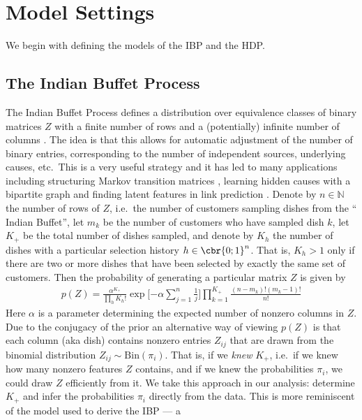 \documentclass[twoside,11pt]{article}
\begin{document}
\section{Model Settings}
\label{sec:model}
We begin with defining the models of the IBP and the HDP.
\subsection{The Indian Buffet Process}
\label{sec:ibp}

The Indian Buffet Process defines a distribution over equivalence
classes of binary matrices $Z$ with a finite number of rows and a
(potentially) infinite number of columns \citep{GriGha06,GriGha11}. The
idea is that this allows for automatic adjustment of the number of
binary entries, corresponding to the number of independent sources,
underlying causes, etc.\ This is a very useful strategy and it has led
to many applications including structuring Markov transition
matrices \citep{FoxSudJorWil10}, learning hidden causes with a bipartite
graph \citep{WooGriGha06} and finding latent features in link prediction \citep{MilGriJor09}.
Denote by $n \in \mathbb{N}$ the number of rows of $Z$, i.e.\ the number of
customers sampling dishes from the `` Indian Buffet'', let $m_k$ be the
number of customers who have sampled dish $k$, let $K_+$ be the total number
of dishes sampled, and denote by $K_h$ the number of dishes with a
particular selection history $h \in \cbr{0;1}^n$. That is, $K_h > 1$
only if there are two or more dishes that have been selected by
exactly the same set of customers. Then the probability of
generating a particular matrix $Z$ is given by \cite{GriGha11}
\begin{align}
  \label{eq:pz}
  p(Z) = \frac{\alpha^{K_+}}{\prod_h K_h!} \exp\Biggl[{-\alpha
    \sum_{j=1}^n \textstyle \frac{1}{j}}\Biggr] \prod_{k=1}^{K_+} \frac{(n-m_k)! (m_k-1)!}{n!}
\end{align}
%
Here $\alpha$ is a parameter determining the expected number of
nonzero columns in $Z$.  Due to the conjugacy of the prior an
alternative way of viewing $p(Z)$ is that each column (aka dish)
contains nonzero entries $Z_{ij}$ that are drawn from the binomial
distribution $Z_{ij} \sim \mathrm{Bin}(\pi_i)$. That is, if we
\emph{knew} $K_+$, i.e.\ if we knew how many nonzero features $Z$
contains, and if we knew the probabilities $\pi_i$, we could draw $Z$
efficiently from it. We take this approach in our analysis: determine
$K_+$ and infer the probabilities $\pi_i$ directly from the data. This
is more reminiscent of the model used to derive the IBP --- a
\end{document}
